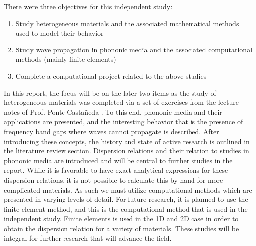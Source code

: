 \documentclass{article}
\begin{document}
There were three objectives for this independent study:
\begin{enumerate}
	\item Study heterogeneous materials and the associated mathematical methods 
	used to model their behavior
	\item Study wave propagation in phononic media and the associated 
	computational methods (mainly finite elements)
	\item Complete a computational project related to the above studies 
\end{enumerate}
In this report, the focus will be on the later two items as the study of 
heterogeneous materials was completed via a set of exercises from the lecture 
notes of Prof. Ponte-Casta\~neda \cite{pontenotes}. To this end, phononic media 
and their applications are presented, and the interesting behavior that is the 
presence of frequency band gaps where waves cannot propagate is described. 
After introducing these concepts, the history and state of active research is 
outlined in the literature review section. Dispersion relations and their 
relation to studies in phononic media are introduced and will be central to 
further studies in the report. While it is favorable to have exact analytical 
expressions for these dispersion relations, it is not possible to calculate 
this by hand for more complicated materials. As such we must utilize 
computational methods which are presented in varying levels of detail. For 
future research, it is planned to use the finite element method, and this is 
the computational method that is used in the independent study. Finite elements 
is used in the 1D and 2D case in order to obtain the dispersion relation for a 
variety of materials. These studies will be integral for further research that 
will advance the field.

\end{document}
